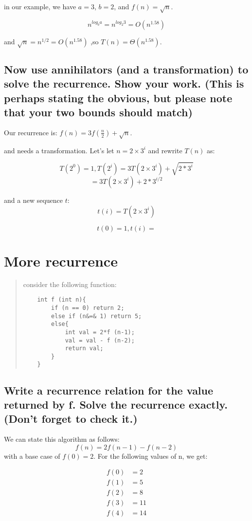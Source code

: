 \documentclass[titlepage]{article}\usepackage[]{graphicx}\usepackage[]{color}
\begin{document}
in our example, we have $a = 3$, $b = 2$, and $f(n) = \sqrt{n}$. 

\[ n^{log_b a} = n^{log_2 3} = O(n^{1.58}) \]

and $\sqrt{n} = n^{1/2} = O(n^{1.58})$ ,so $T(n) = \Theta(n^{1.58})$.

\subsection{Now use annihilators (and a transformation) to solve the recurrence. Show
your work. (This is perhaps stating the obvious, but please note that your two
bounds should match)}
Our recurrence is: $f(n) = 3f(\frac{n}{2}) + \sqrt{n}$. 


and needs a transformation. Let's  let $n = 2\times3^i$ and rewrite $T(n)$ as:

\[ T(2^0) = 1, T(2^i) = 3T(2\times3^i) + \sqrt{2*3^i} \]
\[ = 3T(2\times3^i) + 2*3^{i/2} \]

and a new sequence $t$:
\[ t(i) = T(2\times3^i) \]

\[ t(0) = 1, t(i) =  \]


\section{More recurrence}

\begin{quote}
consider the following function:
\begin{lstlisting}
	int f (int n){
		if (n == 0) return 2;
		else if (n&=& 1) return 5;
		else{
			int val = 2*f (n-1);
			val = val - f (n-2);
			return val;
		}
	}
\end{lstlisting}
\end{quote}

\subsection{Write a recurrence relation for the value returned by f. Solve the
recurrence exactly. (Don't forget to check it.)}
We can state this algorithm as follows:
\[ f(n) = 2f(n-1) - f(n-2) \]
with a base case of $f(0) = 2$. For the following values of n, we get:

\begin{align}
	f(0) &= 2 \\
	f(1) &= 5 \\
	f(2) &= 8 \\
	f(3) &= 11 \\
	f(4) &= 14
	\label{eqn:something}
\end{align}
\end{document}

